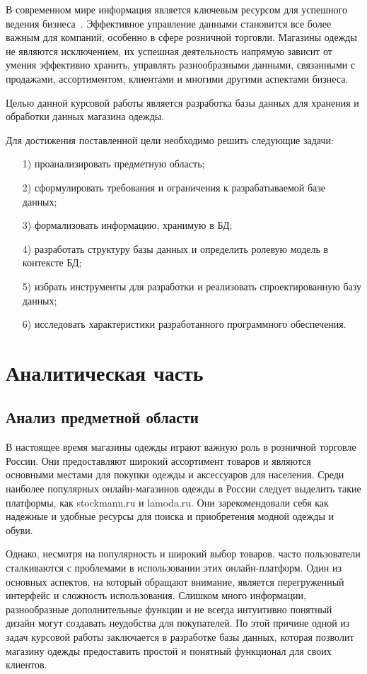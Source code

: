 \documentclass{bmstu}
\begin{document}
В современном мире информация является ключевым ресурсом для успешного ведения бизнеса~\cite{Business}. Эффективное управление данными становится все более важным для компаний, особенно в сфере розничной торговли. Магазины одежды не являются исключением, их успешная деятельность напрямую зависит от умения эффективно хранить, управлять разнообразными данными, связанными с продажами, ассортиментом, клиентами и многими другими аспектами бизнеса.

Целью данной курсовой работы является разработка базы данных для хранения и обработки данных магазина одежды.

Для достижения поставленной цели необходимо решить следующие задачи:
\begin{enumerate}
\item[1)] проанализировать предметную область;
\item[2)] сформулировать требования и ограничения к разрабатываемой базе данных;
\item[3)] формализовать информацию, хранимую в БД;
\item[4)] разработать структуру базы данных и определить ролевую модель в контексте БД;
\item[5)] избрать инструменты для разработки и реализовать спроектированную базу данных;
\item[6)] исследовать характеристики разработанного программного обеспечения.
\end{enumerate}

\chapter{Аналитическая часть}

\section{Анализ предметной области}

В настоящее время магазины одежды играют важную роль в розничной торговле России. Они предоставляют широкий ассортимент товаров и являются основными местами для покупки одежды и аксессуаров для населения. Среди наиболее популярных онлайн-магазинов одежды в России следует выделить такие платформы, как stockmann.ru и lamoda.ru. Они зарекомендовали себя как надежные и удобные ресурсы для поиска и приобретения модной одежды и обуви.

Однако, несмотря на популярность и широкий выбор товаров, часто пользователи сталкиваются с проблемами в использовании этих онлайн-платформ. Один из основных аспектов, на который обращают внимание, является перегруженный интерфейс и сложность использования. Слишком много информации, разнообразные дополнительные функции и не всегда интуитивно понятный дизайн могут создавать неудобства для покупателей. По этой причине одной из задач курсовой работы заключается в разработке базы данных, которая позволит магазину одежды предоставить простой и понятный функционал для своих клиентов.
\end{document}
